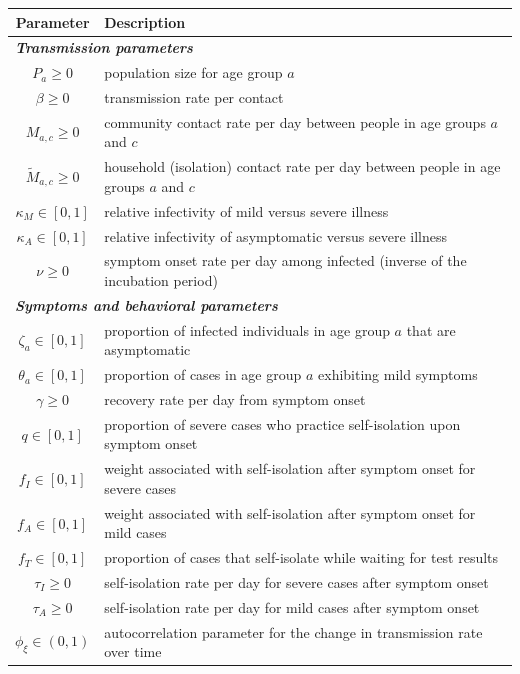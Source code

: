 \documentclass{article}
\begin{document}
\begin{table}[hp!]
\begin{center}
\begin{tabular}{|c|l|}
\hline
Parameter & Description \\
\hline
\multicolumn{2}{|l|}{\textbf{\emph{Transmission parameters}}} \\
\hline
$P_a \ge 0$ & population size for age group $a$ \\
$\beta \ge 0$ & transmission rate per contact \\
$M_{a,c} \ge 0$ & community contact rate per day between people in age groups $a$ and $c$ \\
$\tilde{M}_{a,c} \ge 0$ & household (isolation) contact rate per day between people in age groups $a$ and $c$ \\
$\kappa_M \in [0,1]$ & relative infectivity of mild versus severe illness \\
$\kappa_A \in [0,1]$ & relative infectivity of asymptomatic versus severe illness \\
$\nu \ge 0$ & symptom onset rate per day among infected (inverse of the incubation period) \\
\hline
\multicolumn{2}{|l|}{\textbf{\emph{Symptoms and behavioral parameters}}} \\
\hline
$\zeta_a \in [0,1]$ & proportion of infected individuals in age group $a$ that are asymptomatic \\
$\theta_a \in [0,1]$ & proportion of cases in age group $a$ exhibiting mild symptoms \\
$\gamma \ge 0$ & recovery rate per day from symptom onset \\
$q \in [0,1]$ & proportion of severe cases who practice self-isolation upon symptom onset \\
$f_I \in [0,1]$ & weight associated with self-isolation after symptom onset for severe cases \\
$f_A \in [0,1]$ & weight associated with self-isolation after symptom onset for mild cases \\
$f_T \in [0,1]$ & proportion of cases that self-isolate while waiting for test results \\
$\tau_I \ge 0$ & self-isolation rate per day for severe cases after symptom onset \\
$\tau_A \ge 0$ & self-isolation rate per day for mild cases after symptom onset \\
$\phi_\xi \in (0,1)$ & autocorrelation parameter for the change in transmission rate over time \\

\end{tabular}
\end{center}
\end{table}
\end{document}
